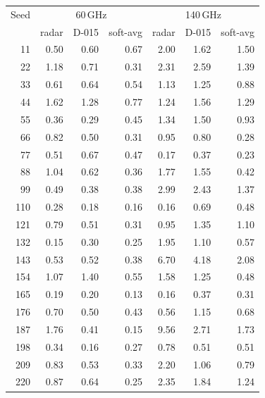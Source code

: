 \begin{tabular}{r rrr rrr}
\toprule
Seed & \multicolumn{3}{c}{60\,GHz} & \multicolumn{3}{c}{140\,GHz} \\
& radar & D-015 & soft-avg & radar & D-015 & soft-avg \\
\midrule
11 & 0.50 & 0.60 & 0.67 & 2.00 & 1.62 & 1.50 \\
22 & 1.18 & 0.71 & 0.31 & 2.31 & 2.59 & 1.39 \\
33 & 0.61 & 0.64 & 0.54 & 1.13 & 1.25 & 0.88 \\
44 & 1.62 & 1.28 & 0.77 & 1.24 & 1.56 & 1.29 \\
55 & 0.36 & 0.29 & 0.45 & 1.34 & 1.50 & 0.93 \\
66 & 0.82 & 0.50 & 0.31 & 0.95 & 0.80 & 0.28 \\
77 & 0.51 & 0.67 & 0.47 & 0.17 & 0.37 & 0.23 \\
88 & 1.04 & 0.62 & 0.36 & 1.77 & 1.55 & 0.42 \\
99 & 0.49 & 0.38 & 0.38 & 2.99 & 2.43 & 1.37 \\
110 & 0.28 & 0.18 & 0.16 & 0.16 & 0.69 & 0.48 \\
121 & 0.79 & 0.51 & 0.31 & 0.95 & 1.35 & 1.10 \\
132 & 0.15 & 0.30 & 0.25 & 1.95 & 1.10 & 0.57 \\
143 & 0.53 & 0.52 & 0.38 & 6.70 & 4.18 & 2.08 \\
154 & 1.07 & 1.40 & 0.55 & 1.58 & 1.25 & 0.48 \\
165 & 0.19 & 0.20 & 0.13 & 0.16 & 0.37 & 0.31 \\
176 & 0.70 & 0.50 & 0.43 & 0.56 & 1.15 & 0.68 \\
187 & 1.76 & 0.41 & 0.15 & 9.56 & 2.71 & 1.73 \\
198 & 0.34 & 0.16 & 0.27 & 0.78 & 0.51 & 0.51 \\
209 & 0.83 & 0.53 & 0.33 & 2.20 & 1.06 & 0.79 \\
220 & 0.87 & 0.64 & 0.25 & 2.35 & 1.84 & 1.24 \\
\bottomrule
\end{tabular}
